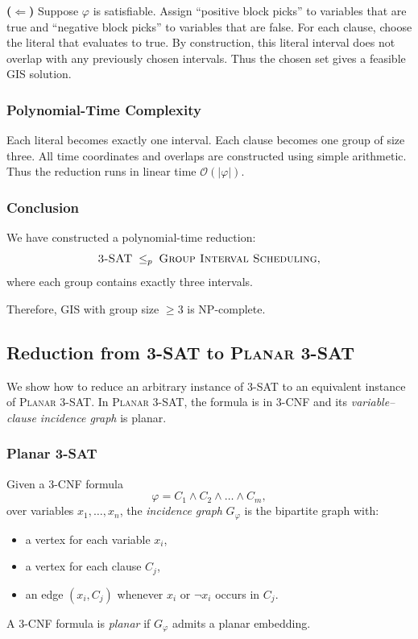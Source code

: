 \documentclass[9pt]{extarticle}
\begin{document}
\textbf{($\Leftarrow$)}  
Suppose $\varphi$ is satisfiable.  
Assign “positive block picks” to variables that are true and “negative block
picks” to variables that are false.  
For each clause, choose the literal that evaluates to true.  
By construction, this literal interval does not overlap with any previously
chosen intervals.  
Thus the chosen set gives a feasible GIS solution.

\subsubsection*{Polynomial-Time Complexity}

Each literal becomes exactly one interval.  
Each clause becomes one group of size three.  
All time coordinates and overlaps are constructed using simple arithmetic.  
Thus the reduction runs in linear time $\mathcal{O}(|\varphi|)$.

\subsubsection*{Conclusion}

We have constructed a polynomial-time reduction:
\[
    \textsc{3-SAT} \;\le_p\; \textsc{Group Interval Scheduling},
\]
where each group contains exactly three intervals.

Therefore, GIS with group size $\ge 3$ is NP-complete.


\subsection{Reduction from \textsc{3-SAT} to \textsc{Planar 3-SAT}}

We show how to reduce an arbitrary instance of \textsc{3-SAT} to an equivalent
instance of \textsc{Planar 3-SAT}.  In \textsc{Planar 3-SAT}, the formula is in
3-CNF and its \emph{variable–clause incidence graph} is planar.

\subsubsection*{Planar 3-SAT}

Given a 3-CNF formula
\[
    \varphi = C_1 \land C_2 \land \dots \land C_m,
\]
over variables $x_1,\dots,x_n$, the \emph{incidence graph} $G_\varphi$ is the
bipartite graph with:
\begin{itemize}
    \item a vertex for each variable $x_i$,
    \item a vertex for each clause $C_j$,
    \item an edge $(x_i,C_j)$ whenever $x_i$ or $\neg x_i$ occurs in $C_j$.
\end{itemize}
A 3-CNF formula is \emph{planar} if $G_\varphi$ admits a planar embedding.
\end{document}
